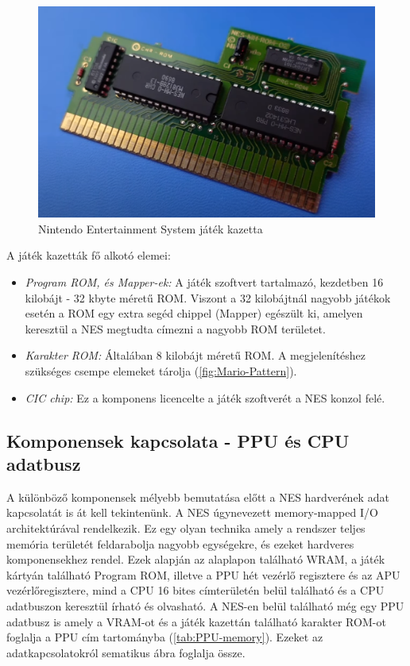 \begin{figure}[H]
	\centering
	\includegraphics[width=150mm, keepaspectratio]{figures/Mario-Duckhunt-cartage}
	\caption{Nintendo Entertainment System játék kazetta \cite{NES_cartridge}}
	\label{fig:NES-Game-Cartridge}
\end{figure}

A  játék kazetták fő alkotó elemei:

\begin{itemize}
	\item \emph{Program ROM, és Mapper-ek:} A játék szoftvert tartalmazó, kezdetben 16 kilobájt - 32 kbyte méretű ROM. Viszont a 32 kilobájtnál nagyobb játékok esetén a ROM egy extra segéd chippel (Mapper) egészült ki, amelyen keresztül a NES megtudta címezni a nagyobb ROM területet. 
	\item \emph{Karakter ROM:} Általában 8 kilobájt méretű ROM. A megjelenítéshez szükséges csempe elemeket tárolja (\ref{fig:Mario-Pattern}).
	\item \emph{CIC chip:} Ez a komponens licencelte a játék szoftverét a NES konzol felé.
\end{itemize}

	\subsection{Komponensek kapcsolata - PPU és CPU adatbusz}
	
	A különböző komponensek mélyebb bemutatása előtt a NES hardverének adat kapcsolatát is át kell tekintenünk. A NES úgynevezett memory-mapped I/O architektúrával rendelkezik. Ez egy olyan technika amely a rendszer teljes memória területét feldarabolja nagyobb egységekre, és ezeket hardveres komponensekhez rendel. Ezek alapján az alaplapon található WRAM, a játék kártyán található Program ROM, illetve a PPU hét vezérlő regisztere és az APU vezérlőregisztere, mind a CPU 16 bites címterületén belül található és a CPU adatbuszon keresztül írható és olvasható. A NES-en belül található még egy PPU adatbusz is amely a VRAM-ot és a játék kazettán található karakter ROM-ot foglalja a PPU cím tartományba (\ref{tab:PPU-memory}). Ezeket az adatkapcsolatokról  sematikus ábra foglalja össze.
	
